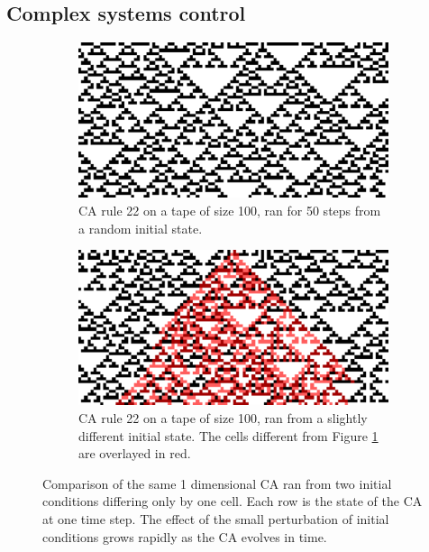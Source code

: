 \subsection{Complex systems control}\label{sec:compl-syst-contr}

\begin{figure}[htbp]
  \centering
  \begin{subfigure}[t]{.47\linewidth}
    \centering
    \includegraphics[width=.93\linewidth]{figures/ca_comp_a}
    \caption{\ac{CA} rule 22 on a tape of size 100, ran for 50 steps from a
      random initial state.}
    \label{fig:ca_comp_a}
  \end{subfigure}
  \hspace{10pt}
  \begin{subfigure}[t]{.47\linewidth}
    \centering
    \includegraphics[width=.93\linewidth]{figures/ca_comp_b}
    \caption{\ac{CA} rule 22 on a tape of size 100, ran from a slightly
      different initial state. The cells different from Figure \ref{fig:ca_comp_a} are
      overlayed in red.}
    \label{fig:ca_comp_b}
  \end{subfigure}

  \caption{Comparison of the same 1 dimensional \ac{CA} ran from two initial conditions
    differing only by one cell. Each row is the state of the \ac{CA} at one time
    step. The effect of the small perturbation of initial conditions grows
    rapidly as the \ac{CA} evolves in time.}
  \label{fig:ca_comp}
\end{figure}


